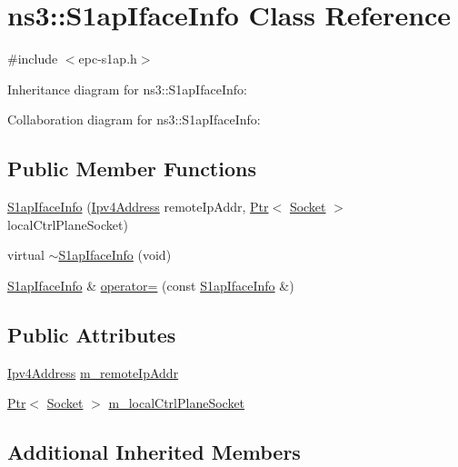 \hypertarget{classns3_1_1S1apIfaceInfo}{}\section{ns3\+:\+:S1ap\+Iface\+Info Class Reference}
\label{classns3_1_1S1apIfaceInfo}


{\ttfamily \#include $<$epc-\/s1ap.\+h$>$}



Inheritance diagram for ns3\+:\+:S1ap\+Iface\+Info\+:


Collaboration diagram for ns3\+:\+:S1ap\+Iface\+Info\+:
\subsection*{Public Member Functions}
\begin{DoxyCompactItemize}
\item 
\hyperlink{classns3_1_1S1apIfaceInfo_a386444460441a376620e379f9f3b753c}{S1ap\+Iface\+Info} (\hyperlink{classns3_1_1Ipv4Address}{Ipv4\+Address} remote\+Ip\+Addr, \hyperlink{classns3_1_1Ptr}{Ptr}$<$ \hyperlink{classns3_1_1Socket}{Socket} $>$ local\+Ctrl\+Plane\+Socket)
\item 
virtual \hyperlink{classns3_1_1S1apIfaceInfo_ac8122feeecd78170d924717a5537977a}{$\sim$\+S1ap\+Iface\+Info} (void)
\item 
\hyperlink{classns3_1_1S1apIfaceInfo}{S1ap\+Iface\+Info} \& \hyperlink{classns3_1_1S1apIfaceInfo_a6d0ea73fdf35a91e222961c324963bec}{operator=} (const \hyperlink{classns3_1_1S1apIfaceInfo}{S1ap\+Iface\+Info} \&)
\end{DoxyCompactItemize}
\subsection*{Public Attributes}
\begin{DoxyCompactItemize}
\item 
\hyperlink{classns3_1_1Ipv4Address}{Ipv4\+Address} \hyperlink{classns3_1_1S1apIfaceInfo_aed36ecb56275b66a24fad05806a31b95}{m\+\_\+remote\+Ip\+Addr}
\item 
\hyperlink{classns3_1_1Ptr}{Ptr}$<$ \hyperlink{classns3_1_1Socket}{Socket} $>$ \hyperlink{classns3_1_1S1apIfaceInfo_a3996870825b7ca1c0581329b8533041d}{m\+\_\+local\+Ctrl\+Plane\+Socket}
\end{DoxyCompactItemize}
\subsection*{Additional Inherited Members}


